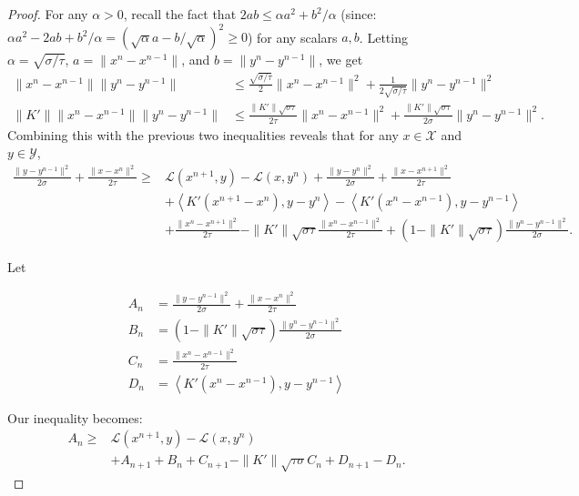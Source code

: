\documentclass[10pt,a4paper]{amsart}
\begin{document}
\begin{proof}
For any $\alpha >0$, recall the fact that $2ab \leq \alpha a^2+b^2/\alpha$ (since: \(\alpha a^2-2ab+b^2/ \alpha = (\sqrt{\alpha}a-b/\sqrt{\alpha})^2 \ge0\)) for any scalars $a,b$. Letting $\alpha=\sqrt{\sigma/\tau}$, $a=\|x^n-x^{n-1}\|$, and $b=\|y^{n}-y^{n-1}\|$, we get
\begin{align*}
    \|x^n-x^{n-1}\|\|y^{n}-y^{n-1}\| &\leq \frac{\sqrt{\sigma/\tau}}{2} \|x^n-x^{n-1}\|^2+\frac{1}{2\sqrt{\sigma/\tau}}\|y^{n}-y^{n-1}\|^2 \\
    \|K'\|\|x^n-x^{n-1}\|\|y^{n}-y^{n-1}\| &\leq \frac{\|K'\|\sqrt{\sigma\tau}}{2\tau}\|x^n-x^{n-1}\|^2+\frac{\|K'\|\sqrt{\sigma\tau}}{2\sigma}\|y^{n}-y^{n-1}\|^2.
\end{align*}
Combining this with the previous two inequalities reveals that for any $x \in \mathcal{X}$ and $y\in \mathcal{Y}$,
\begin{equation}
\label{N term before summation}
\begin{aligned}
    \frac{\|y-y^{n-1}\|^2}{2\sigma}+\frac{\|x-x^n\|^2}{2\tau} \geq& \mathcal{L}(x^{n+1},y)- \mathcal{L}(x,y^n) + \frac{\|y-y^{n}\|^2}{2\sigma}+\frac{\|x-x^{n+1}\|^2}{2\tau}\\
    &+ \left \langle K'(x^{n+1}-x^n), y-y^{n}\right \rangle - \left \langle K'(x^n-x^{n-1}), y-y^{n-1}\right \rangle\\
    &+ \frac{\|x^n-x^{n+1}\|^2}{2\tau}-\|K'\|\sqrt{\sigma\tau}\frac{\|x^n-x^{n-1}\|^2}{2\tau} +(1-\|K'\|\sqrt{\sigma\tau})\frac{\|y^{n}-y^{n-1}\|^2}{2\sigma}.
\end{aligned}
\end{equation}

Let 

\[
\label{An to Dn}
    \begin{aligned}
A_n &= \frac{\|y-y^{n-1}\|^2}{2\sigma} + \frac{\|x-x^n\|^2}{2\tau} \\
B_n &= (1-\|K'\|\sqrt{\sigma\tau}) \frac{\|y^n - y^{n-1}\|^2}{2\sigma} \\
C_n &= \frac{\|x^n - x^{n-1}\|^2}{2\tau} \\
D_n &= \left\langle K'(x^n - x^{n-1}), y - y^{n-1} \right\rangle
\end{aligned}
\]

Our inequality becomes:
\[
\begin{aligned}
    A_n \geq& \mathcal{L}(x^{n+1},y)- \mathcal{L}(x,y^n)\\ &+ A_{n+1} +B_n +C_{n+1}-\|K'\|\sqrt{\tau\sigma}C_n +D_{n+1}-D_n.
\end{aligned}
\]


\end{proof}
\end{document}
